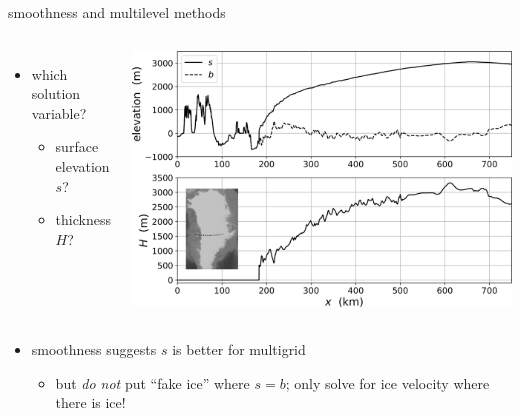 \documentclass[usepdftitle=false,usenames,dvipsnames]{beamer}
\begin{document}
\begin{frame}{smoothness and multilevel methods}

\begin{columns}
    \begin{itemize}
    \small
    \item which solution variable?
        \begin{itemize}
        \item surface elevation $s$?
        \item thickness $H$?
        \end{itemize}
    \end{itemize}
    \includegraphics[width=\textwidth]{figs/giscross.png}
\end{columns}

\bigskip
\begin{itemize}
\item \alert{smoothness suggests $s$ is better for multigrid}
    \begin{itemize}
    \item but \emph{do not} put ``fake ice'' where $s=b$; only solve for ice velocity where there is ice!
    \end{itemize}
\end{itemize}
\end{frame}
\end{document}
